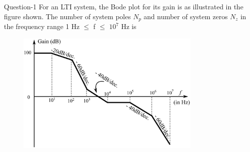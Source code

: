 \documentclass[journal,12pt,twocolumn]{IEEEtran}
\begin{document}
%

\begin{abstract}
Gate Control System Question and Solution 
\end{abstract}
\begin{frame}{Question-1}
\textsf{ For an LTI system, the Bode plot for its gain is as illustrated in the figure shown. The number of system poles $N_{p}$ and number of system zeros $N_{z}$ in the frequency range 1 Hz $\leq$ f $\leq$ $10^{7}$ Hz is}

\begin{figure}[htp]
    \centering
    \includegraphics[width=9cm]{./figs/figure.eps}
    
    \label{fig:galaxy}
\end{figure}
\end{frame}
\end{document}
